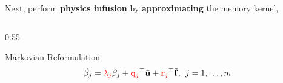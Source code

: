 \begin{frame}{\small Next, perform \textbf{physics infusion} by \textbf{approximating} the memory kernel,}
\begin{columns}
\begin{column}{0.55\textwidth}
{\begin{graybox}{Markovian Reformulation}
{                \begin{equation*}
                    \dot{\beta}_j = \textcolor{red}{\lambda_j}\beta_j + \textcolor{red}{{\mathbf{q}}_j}^\top\bar{{\mathbf{u}}} + \textcolor{red}{{\mathbf{r}}_j}^\top\bar{{\mathbf{f}}},\:\: j=1,\dots,m
                \end{equation*}}
            \end{graybox}}
        \end{column}
    \end{columns}
\end{frame}

